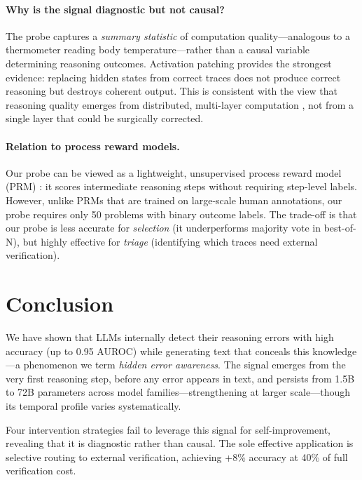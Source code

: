 \documentclass[11pt]{article}
\begin{document}
\paragraph{Why is the signal diagnostic but not causal?}
The probe captures a \textit{summary statistic} of computation quality---analogous to a thermometer reading body temperature---rather than a causal variable determining reasoning outcomes.
Activation patching provides the strongest evidence: replacing hidden states from correct traces does not produce correct reasoning but destroys coherent output.
This is consistent with the view that reasoning quality emerges from distributed, multi-layer computation \cite{meng2022locating}, not from a single layer that could be surgically corrected.

\paragraph{Relation to process reward models.}
Our probe can be viewed as a lightweight, unsupervised process reward model (PRM) \cite{lightman2024lets}: it scores intermediate reasoning steps without requiring step-level labels.
However, unlike PRMs that are trained on large-scale human annotations, our probe requires only 50 problems with binary outcome labels.
The trade-off is that our probe is less accurate for \textit{selection} (it underperforms majority vote in best-of-N), but highly effective for \textit{triage} (identifying which traces need external verification).

\section{Conclusion}
\label{sec:conclusion}

We have shown that LLMs internally detect their reasoning errors with high accuracy (up to 0.95 AUROC) while generating text that conceals this knowledge---a phenomenon we term \textit{hidden error awareness}.
The signal emerges from the very first reasoning step, before any error appears in text, and persists from 1.5B to 72B parameters across model families---strengthening at larger scale---though its temporal profile varies systematically.

Four intervention strategies fail to leverage this signal for self-improvement, revealing that it is diagnostic rather than causal.
The sole effective application is selective routing to external verification, achieving +8\% accuracy at 40\% of full verification cost.
\end{document}
